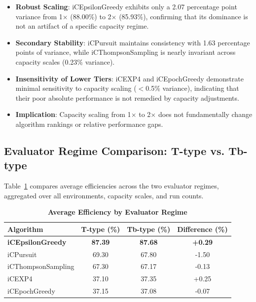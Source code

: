 \documentclass[12pt,a4paper]{article}
\newcommand{\performance}[1]{\textcolor{performancecolor}{\textbf{#1}}}
\newcommand{\critical}[1]{\textcolor{criticalcolor}{\textbf{#1}}}
\begin{document}
\begin{itemize}
\item \performance{Robust Scaling}: iCEpsilonGreedy exhibits only a 2.07 percentage point variance from 1$\times$ (88.00\%) to 2$\times$ (85.93\%), confirming that its dominance is not an artifact of a specific capacity regime.
\item \performance{Secondary Stability}: iCPursuit maintains consistency with 1.63 percentage points of variance, while iCThompsonSampling is nearly invariant across capacity scales (0.23\% variance).
\item \performance{Insensitivity of Lower Tiers}: iCEXP4 and iCEpochGreedy demonstrate minimal sensitivity to capacity scaling ($<$0.5\% variance), indicating that their poor absolute performance is not remedied by capacity adjustments.
\item \critical{Implication}: Capacity scaling from 1$\times$ to 2$\times$ does not fundamentally change algorithm rankings or relative performance gaps.
\end{itemize}

\subsection{Evaluator Regime Comparison: T-type vs. Tb-type}

Table~\ref{tab:regime-comparison} compares average efficiencies across the two evaluator regimes, aggregated over all environments, capacity scales, and run counts.

\begin{table}[H]
\centering
\caption{\performance{Average Efficiency by Evaluator Regime}}
\label{tab:regime-comparison}
\begin{tabular}{|l|c|c|c|}
\hline
\textbf{Algorithm} & \textbf{T-type (\%)} & \textbf{Tb-type (\%)} & \textbf{Difference (\%)} \\
\hline
\hline
\performance{iCEpsilonGreedy}   & \performance{87.39} & \performance{87.68} & \performance{+0.29} \\
iCPursuit                       & 69.30 & 67.80 & -1.50 \\
iCThompsonSampling              & 67.30 & 67.17 & -0.13 \\
iCEXP4                          & 37.10 & 37.35 & +0.25 \\
iCEpochGreedy                   & 37.15 & 37.08 & -0.07 \\
\hline
\end{tabular}
\end{table}
\end{document}

